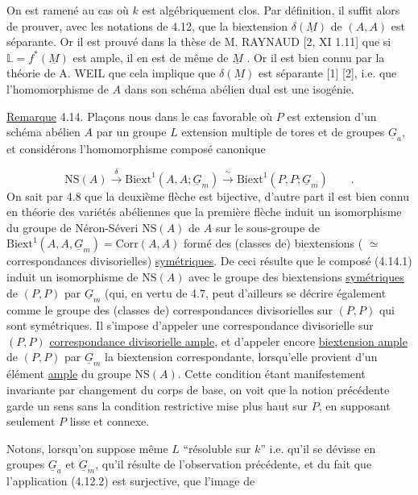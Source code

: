 On est ramené au cas où $k$ est algébriquement clos. Par définition, il suffit alors de prouver, avec les notations de 4.12, que la biextension $\delta(\underline{M})$ de $(A,A)$ est séparante. Or il est prouvé dans la thèse de M. RAYNAUD [2, XI 1.11] que si $\mathbb{L} = f^{*}(\underline{M})$ est ample, il en est de même de $\underline{M}$ . Or il est bien connu par la théorie de A. WEIL que cela implique que $\delta(\underline{M})$ est séparante [1] [2], i.e. que l'homomorphisme de $A$ dans son schéma abélien dual est une isogénie.

\underline{Remarque} 4.14. Plaçons nous dans le cas favorable où $P$ est extension d'un schéma abélien $A$ par un groupe $L$ extension multiple de tores et de groupes $\underline{G}_{a}$, et considérons l'homomorphisme composé canonique 



\begin{equation}\tag{4.14.1}
 \mathrm{NS}(A) \xrightarrow{\ \delta\ } \mathrm{Biext}^{1}(A,A;\underline{G}_{m}) \xrightarrow{\ \sim\ } \mathrm{Biext}^{1}(P,P;\underline{G}_{m}) \qquad .
\end{equation}
On sait par 4.8 que la deuxième flèche est bijective, d'autre part il est bien connu en théorie des variétés abéliennes que la première flèche induit un isomorphisme du groupe de Néron-Séveri $\mathrm{NS}(A)$ de $A$ sur le sous-groupe de $\mathrm{Biext}^{1}(A,A,\underline{G}_{m}) = \mathrm{Corr}(A,A)$ formé des (classes de) biextensions ( $\simeq$ correspondances divisorielles) \underline{symétriques}. De ceci résulte que le composé (4.14.1) induit un isomorphisme de $\mathrm{NS}(A)$ avec le groupe des biextensions \underline{symétriques} de $(P,P)$ par $\underline{G}_{m}$ (qui, en vertu de 4.7, peut d'ailleurs se décrire également comme le groupe des (classes de) correspondances divisorielles sur $(P,P)$ qui sont symétriques. Il s'impose d'appeler une correspondance divisorielle sur $(P,P)$ \underline{correspondance divisorielle ample}, et d'appeler encore \underline{biextension ample} de $(P,P)$ par $\underline{G}_{m}$ la biextension correspondante, lorsqu'elle provient d'un élément \underline{ample} du groupe $\mathrm{NS}(A)$. Cette condition étant manifestement invariante par changement du corps de base, on voit que la notion précédente garde un sens sans la condition restrictive mise plus haut sur $P$, en supposant seulement $P$ lisse et connexe.

Notons, lorsqu'on suppose même $L$ ``résoluble sur $k$'' i.e. qu'il se dévisse en groupes $\underline{G}_{a}$ et $\underline{G}_{m}$, qu'il résulte de l'observation précédente, et du fait que l'application (4.12.2) est surjective, que l'image de

